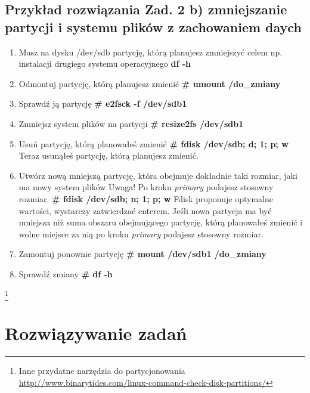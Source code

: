\documentclass[a4paper,titlepage,12pt]{mwart}
\begin{document}
\subsection{Przykład rozwiązania Zad. 2 b) zmniejszanie partycji i systemu plików z zachowaniem daych}
\begin{enumerate}
\item{Masz na dysku /dev/sdb partycję, którą planujesz zmniejszyć celem np. instalacji drugiego systemu operacyjnego}
\textbf{df -h}
\item{Odmontuj partycję, którą planujesz zmienić}
\textbf{# umount /do_zmiany}
\item{Sprawdź ją partycję}
\textbf{# e2fsck -f /dev/sdb1}
\item{Zmniejsz system plików na partycji}
\textbf{# resize2fs /dev/sdb1}
\item{Usuń partycję, którą planowałeś zmienić}
\textbf{# fdisk /dev/sdb; d; 1; p; w}
Teraz usunąłeś partycję, którą planujesz zmienić.
\item{Utwórz nową mniejszą partycję, która obejmuje dokładnie taki rozmiar, jaki ma nowy system plików}
Uwaga! Po kroku \textit{primary} podajesz stosowny rozmiar.
\textbf{# fdisk /dev/sdb; n; 1; p; w}
Fdisk proponuje optymalne wartości, wystarczy zatwierdzać enterem. Jeśli nowa partycja ma być mniejsza niż suma obszaru obejmującego partycję, którą planowałeś zmienić i wolne miejsce za nią po kroku \textit{primary} podajesz stosowny rozmiar.
\item{Zamontuj ponownie partycję}
\textbf{# mount /dev/sdb1 /do_zmiany}
\item{Sprawdź zmiany}
\textbf{# df -h}
\end{enumerate}
\footnote{Inne przydatne narzędzia do partycjonowania \url{http://www.binarytides.com/linux-command-check-disk-partitions/}}
\section{Rozwiązywanie zadań}
\end{document}
